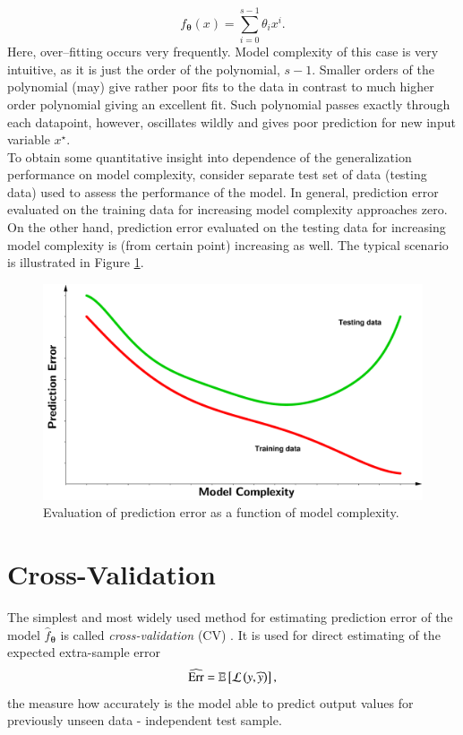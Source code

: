 \begin{equation}
	f_{\boldsymbol{\theta}}(x) = \sum_{i=0}^{s-1}\theta_ix^i.
\end{equation}
 Here, over--fitting occurs very frequently. Model complexity of this case is very intuitive, as it is just the order of the polynomial, $s-1$.  Smaller orders of the polynomial (may) give rather poor fits to the data in contrast to much higher order polynomial giving an excellent fit. Such polynomial passes exactly through each datapoint, however, oscillates wildly and gives poor prediction for new input variable $x^{\star}$. \\
To obtain some quantitative insight into dependence of the generalization performance on model complexity, consider separate test set of data (testing data) used to assess the performance of the model. 
In general, prediction error evaluated on the training data for increasing model complexity approaches zero. On the other hand, prediction error evaluated on the testing data for increasing model complexity is (from certain point) increasing as well. The typical scenario is illustrated in Figure \ref{fig:Prediction_error}.
 \begin{figure}[h]
	\centering
	\includegraphics[width=16.0cm]{plots/Images/PE3.pdf}
	\caption{Evaluation of prediction error as a function of model complexity.}%
	\label{fig:Prediction_error}%
\end{figure}

\section{Cross-Validation}
The simplest and most widely used method for estimating prediction error of  the model $\hat{f}_{\boldsymbol{\theta}}$ is called \emph{cross-validation} (CV) \cite{statistics}. It is used for direct estimating of the expected extra-sample error
\begin{equation}
	\widehat{\mathrm{Err}} = \mathbb{E}\left[\mathcal{L}\left(y, \widehat{y}\right)\right],
\end{equation}
the measure how accurately is the model able to predict output values for previously unseen data - independent test sample. 


